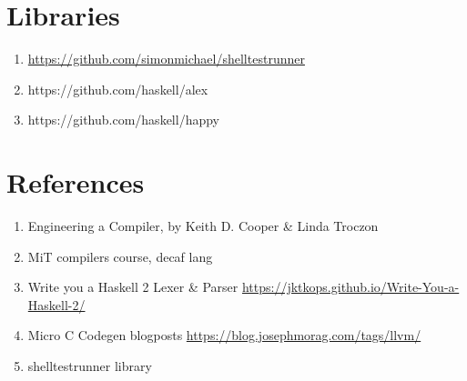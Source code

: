 \documentclass{article}
\begin{document}
\section{Libraries}
\begin{enumerate}
    \item \url{https://github.com/simonmichael/shelltestrunner}
    \item https://github.com/haskell/alex
    \item https://github.com/haskell/happy
\end{enumerate}


\section{References}
\begin{enumerate}
    \item  Engineering a Compiler, by Keith D. Cooper & Linda Troczon
    \item MiT compilers course, decaf lang
    \item Write you a Haskell 2 Lexer \& Parser \url{https://jktkops.github.io/Write-You-a-Haskell-2/}
    \item Micro C Codegen blogposts \url{https://blog.josephmorag.com/tags/llvm/}
    \item shelltestrunner library
\end{enumerate}
\end{document}

